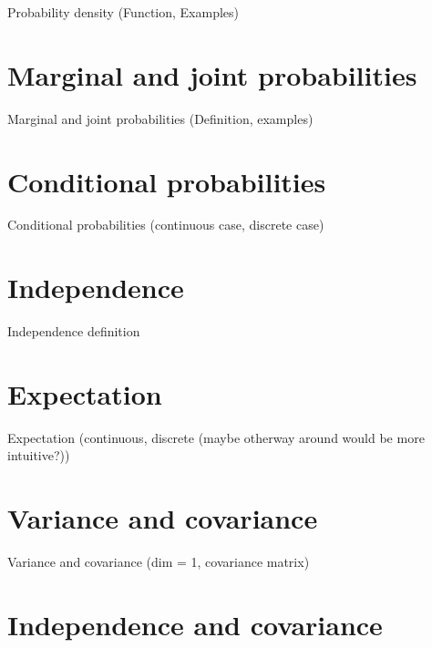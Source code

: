 \documentclass{beamer}
\begin{document}
\begin{frame}{Probability density}
  (Function, Examples)
\end{frame}

\section{Marginal and joint probabilities}

\begin{frame}{Marginal and joint probabilities}
  (Definition, examples)
\end{frame}

\section{Conditional probabilities}

\begin{frame}{Conditional probabilities}
  (continuous case, discrete case)
\end{frame}

\section{Independence}

\begin{frame}{Independence}
  definition
\end{frame}

\section{Expectation}

\begin{frame}{Expectation}
  (continuous, discrete (maybe otherway around would be more intuitive?))
\end{frame}

\section{Variance and covariance}

\begin{frame}{Variance and covariance}
  (dim = 1, covariance matrix)
\end{frame}

\section{Independence and covariance}
\end{document}
